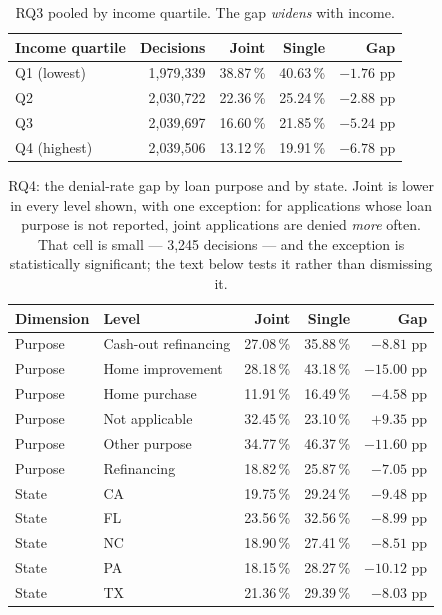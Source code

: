 \documentclass[sigconf,balance=false]{acmart}
\begin{document}
\begin{table}[t]
\caption{RQ3 pooled by income quartile. The gap \emph{widens} with income.}
\label{tab:rq3inc}
\centering
\begin{tabular}{@{}lrrrr@{}}
\toprule
Income quartile & Decisions & Joint & Single & Gap \\
\midrule
Q1 (lowest)  & 1{,}979{,}339 & 38.87\,\% & 40.63\,\% & $-1.76$ pp \\
Q2           & 2{,}030{,}722 & 22.36\,\% & 25.24\,\% & $-2.88$ pp \\
Q3           & 2{,}039{,}697 & 16.60\,\% & 21.85\,\% & $-5.24$ pp \\
Q4 (highest) & 2{,}039{,}506 & 13.12\,\% & 19.91\,\% & $\mathbf{-6.78}$ pp \\
\bottomrule
\end{tabular}
\end{table}
\begin{table}[t]
\caption{RQ4: the denial-rate gap by loan purpose and by state. Joint is
         lower in every level shown, with one exception: for applications
         whose loan purpose is not reported, joint applications are denied
         \emph{more} often. That cell is small --- 3{,}245 decisions --- and
         the exception is statistically significant; the text below tests
         it rather than dismissing it.}
\label{tab:rq4}
\centering
\footnotesize
\begin{tabular}{@{}llrrr@{}}
\toprule
Dimension & Level & Joint & Single & Gap \\
\midrule
Purpose & Cash-out refinancing & 27.08\,\% & 35.88\,\% & $-8.81$ pp \\
Purpose & Home improvement     & 28.18\,\% & 43.18\,\% & $\mathbf{-15.00}$ pp \\
Purpose & Home purchase        & 11.91\,\% & 16.49\,\% & $-4.58$ pp \\
Purpose & Not applicable       & 32.45\,\% & 23.10\,\% & $+9.35$ pp \\
Purpose & Other purpose        & 34.77\,\% & 46.37\,\% & $-11.60$ pp \\
Purpose & Refinancing          & 18.82\,\% & 25.87\,\% & $-7.05$ pp \\
\midrule
State & CA & 19.75\,\% & 29.24\,\% & $-9.48$ pp \\
State & FL & 23.56\,\% & 32.56\,\% & $-8.99$ pp \\
State & NC & 18.90\,\% & 27.41\,\% & $-8.51$ pp \\
State & PA & 18.15\,\% & 28.27\,\% & $-10.12$ pp \\
State & TX & 21.36\,\% & 29.39\,\% & $-8.03$ pp \\
\bottomrule
\end{tabular}
\end{table}
\end{document}
